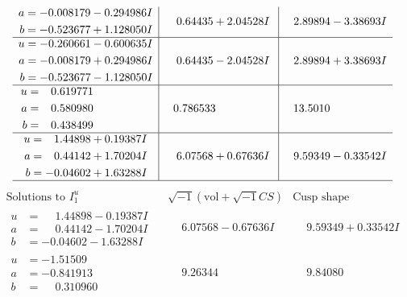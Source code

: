 \documentclass[1p]{elsarticle_modified}
\theoremstyle{definition}
\newcommand{\I}{\sqrt{-1}}
\begin{document}
$$\begin{array}{c|c|c}
\begin{aligned}
a &= -0.008179 - 0.294986 I \\
b &= -0.523677 + 1.128050 I\end{aligned}
 & \phantom{-}0.64435 + 2.04528 I & \phantom{-}2.89894 - 3.38693 I \\ \hline\begin{aligned}
u &= -0.260661 - 0.600635 I \\
a &= -0.008179 + 0.294986 I \\
b &= -0.523677 - 1.128050 I\end{aligned}
 & \phantom{-}0.64435 - 2.04528 I & \phantom{-}2.89894 + 3.38693 I \\ \hline\begin{aligned}
u &= \phantom{-}0.619771\phantom{ +0.000000I} \\
a &= \phantom{-}0.580980\phantom{ +0.000000I} \\
b &= \phantom{-}0.438499\phantom{ +0.000000I}\end{aligned}
 & \phantom{-}0.786533\phantom{ +0.000000I} & \phantom{-}13.5010\phantom{ +0.000000I} \\ \hline\begin{aligned}
u &= \phantom{-}1.44898 + 0.19387 I \\
a &= \phantom{-}0.44142 + 1.70204 I \\
b &= -0.04602 + 1.63288 I\end{aligned}
 & \phantom{-}6.07568 + 0.67636 I & \phantom{-}9.59349 - 0.33542 I\\
 \hline 
 \end{array}$$\newpage$$\begin{array}{c|c|c}  
\text{Solutions to }I^u_{1}& \I (\text{vol} + \sqrt{-1}CS) & \text{Cusp shape}\\
 \hline 
\begin{aligned}
u &= \phantom{-}1.44898 - 0.19387 I \\
a &= \phantom{-}0.44142 - 1.70204 I \\
b &= -0.04602 - 1.63288 I\end{aligned}
 & \phantom{-}6.07568 - 0.67636 I & \phantom{-}9.59349 + 0.33542 I \\ \hline\begin{aligned}
u &= -1.51509\phantom{ +0.000000I} \\
a &= -0.841913\phantom{ +0.000000I} \\
b &= \phantom{-}0.310960\phantom{ +0.000000I}\end{aligned}
 & \phantom{-}9.26344\phantom{ +0.000000I} & \phantom{-}9.84080\phantom{ +0.000000I} \\ \hline\begin{aligned}

\end{aligned}
\end{array}$$
\end{document}
